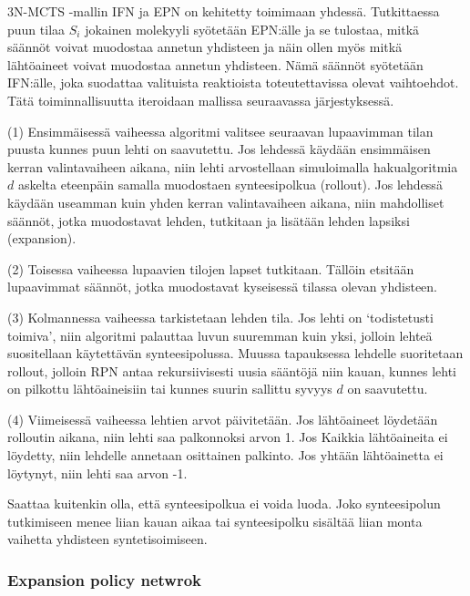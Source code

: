 \documentclass[finnish,twoside,censored,tkt,sw-line]{HYthesisML}
\begin{document}
3N-MCTS -mallin IFN ja EPN on kehitetty toimimaan yhdessä.
Tutkittaessa puun tilaa \(S_i\) jokainen molekyyli syötetään EPN:älle ja se tulostaa, mitkä säännöt voivat muodostaa annetun yhdisteen ja näin ollen myös mitkä lähtöaineet voivat muodostaa annetun yhdisteen.
Nämä säännöt syötetään IFN:älle, joka suodattaa valituista reaktioista toteutettavissa olevat vaihtoehdot.
Tätä toiminnallisuutta iteroidaan mallissa seuraavassa järjestyksessä.

(1) Ensimmäisessä vaiheessa algoritmi valitsee seuraavan lupaavimman tilan puusta kunnes puun lehti on saavutettu.
Jos lehdessä käydään ensimmäisen kerran valintavaiheen aikana, niin lehti arvostellaan simuloimalla hakualgoritmia \(d\) askelta eteenpäin samalla muodostaen synteesipolkua (rollout).
Jos lehdessä käydään useamman kuin yhden kerran valintavaiheen aikana, niin mahdolliset säännöt, jotka muodostavat lehden, tutkitaan ja lisätään lehden lapsiksi (expansion).

(2) Toisessa vaiheessa lupaavien tilojen lapset tutkitaan.
Tällöin etsitään lupaavimmat säännöt, jotka muodostavat kyseisessä tilassa olevan yhdisteen.

(3) Kolmannessa vaiheessa tarkistetaan lehden tila.
Jos lehti on `todistetusti toimiva', niin algoritmi palauttaa luvun suuremman kuin yksi, jolloin lehteä suositellaan käytettävän synteesipolussa.
Muussa tapauksessa lehdelle suoritetaan rollout, jolloin RPN antaa rekursiivisesti uusia sääntöjä niin kauan, kunnes lehti on pilkottu lähtöaineisiin tai kunnes suurin sallittu syvyys \(d\) on saavutettu.

(4) Viimeisessä vaiheessa lehtien arvot päivitetään.
Jos lähtöaineet löydetään rolloutin aikana, niin lehti saa palkonnoksi arvon 1.
Jos Kaikkia lähtöaineita ei löydetty, niin lehdelle annetaan osittainen palkinto.
Jos yhtään lähtöainetta ei löytynyt, niin lehti saa arvon -1.

Saattaa kuitenkin olla, että synteesipolkua ei voida luoda.
Joko synteesipolun tutkimiseen menee liian kauan aikaa tai synteesipolku sisältää liian monta vaihetta yhdisteen syntetisoimiseen.


\subsubsection{Expansion policy netwrok}
\end{document}
